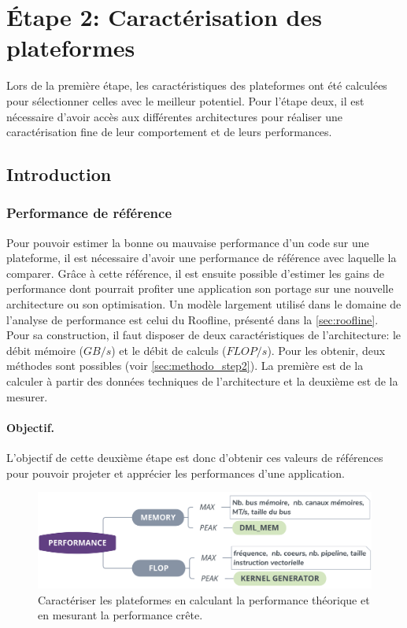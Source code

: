 \section{Étape 2: Caractérisation des plateformes}\label{sec:methodo_step2}

Lors de la première étape, les caractéristiques des plateformes ont été calculées pour sélectionner celles avec le meilleur potentiel. Pour l'étape deux, il est nécessaire d'avoir accès aux différentes architectures pour réaliser une caractérisation fine de leur comportement et de leurs performances.

\subsection{Introduction}

    \subsubsection{Performance de référence}
        
        Pour pouvoir estimer la bonne ou mauvaise performance d'un code sur une plateforme, il est nécessaire d'avoir une performance de référence avec laquelle la comparer. Grâce à cette référence, il est ensuite possible d'estimer les gains de performance dont pourrait profiter une application son portage sur une nouvelle architecture ou son optimisation. Un modèle largement utilisé dans le domaine de l'analyse de performance est celui du Roofline, présenté dans la \autoref{sec:roofline}. Pour sa construction, il faut disposer de deux caractéristiques de l'architecture: le débit mémoire ($GB/s$) et le débit de calculs ($FLOP/s$). Pour les obtenir, deux méthodes sont possibles (voir \autoref{sec:methodo_step2}). La première est de la calculer à partir des données techniques de l'architecture et la deuxième est de la mesurer.
        
        \paragraph{Objectif.} L'objectif de cette deuxième étape est donc d'obtenir ces valeurs de références pour pouvoir projeter et apprécier les performances d'une application. 

        \begin{figure}[h!]
        \center
        \includegraphics[width=14cm]{images/methodo_step2.png}
        \caption{\label{pic:methodo_step2}Caractériser les plateformes en calculant la performance théorique et en mesurant la performance crête.}
        \end{figure}


